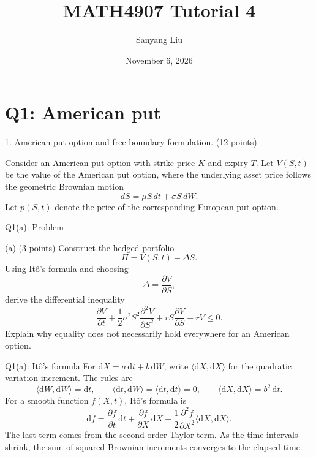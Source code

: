 \documentclass{beamer}
\title[MATH4907 Tutorial 4]{MATH4907 Tutorial 4}
\author{Sanyang Liu}
\date{November 6, 2026}
\newcommand{\dd}{\mathrm d}
\begin{document}
\maketitle

\section{Q1: American put}

\begin{frame}{1. American put option and free-boundary formulation.}
\footnotesize
\setlength{\abovedisplayskip}{5pt}
\setlength{\belowdisplayskip}{5pt}
\hfill (12 points)\par
Consider an American put option with strike price $K$ and expiry $T$. Let $V(S,t)$ be
the value of the American put option, where the underlying asset price follows the
geometric Brownian motion
\[
dS=\mu S\,dt+\sigma S\,dW.
\]
Let $p(S,t)$ denote the price of the corresponding European put option.

\end{frame}

\begin{frame}{Q1(a): Problem}
\footnotesize
\setlength{\abovedisplayskip}{5pt}
\setlength{\belowdisplayskip}{5pt}
\begin{block}{(a) \hfill (3 points)}
Construct the hedged portfolio
\[
\Pi=V(S,t)-\Delta S.
\]
Using It\^o's formula and choosing
\[
\Delta=\frac{\partial V}{\partial S},
\]
derive the differential inequality
\[
\frac{\partial V}{\partial t}
+\frac12\sigma^2 S^2\frac{\partial^2V}{\partial S^2}
+rS\frac{\partial V}{\partial S}-rV\leq0.
\]
Explain why equality does not necessarily hold everywhere for an American option.
\end{block}
\end{frame}

\begin{frame}{Q1(a): It\^o's formula}
\small
For $\dd X=a\,\dd t+b\,\dd W$, write $\langle\dd X,\dd X\rangle$
for the quadratic variation increment. The rules are
\[\boxed{
\langle\dd W,\dd W\rangle=\dd t,\qquad
\langle\dd t,\dd W\rangle=\langle\dd t,\dd t\rangle=0,
\qquad
\langle\dd X,\dd X\rangle=b^2\,\dd t.}
\]
For a smooth function $f(X,t)$, It\^o's formula is
\[
\boxed{
\dd f=\frac{\partial f}{\partial t}\,\dd t
+\frac{\partial f}{\partial X}\,\dd X
+\frac12\frac{\partial^2 f}{\partial X^2}\langle\dd X,\dd X\rangle.}
\]
The last term comes from the second-order Taylor term. As the time
intervals shrink, the sum of squared Brownian increments converges
to the elapsed time.
\end{frame}
\end{document}
